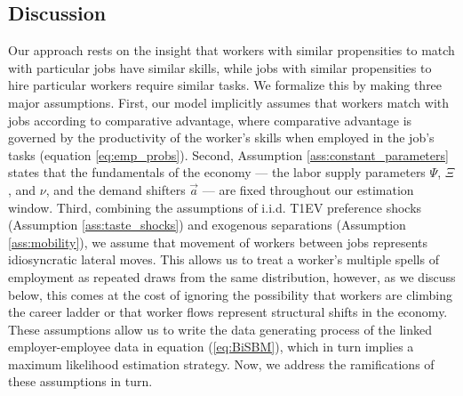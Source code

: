 \documentclass[12pt]{article}
\theoremstyle{definition}
\theoremstyle{plain}
\begin{document}
\subsection{Discussion}

\label{sec:bisbm_discussion}

Our approach rests on the insight that workers with similar propensities to match with particular jobs have similar skills, while jobs with similar propensities to hire particular workers require similar tasks. We formalize this by making three major assumptions. First, our model implicitly assumes that workers match with jobs according to comparative advantage, where comparative advantage is governed by the productivity of the worker's skills when employed in the job's tasks (equation \ref{eq:emp_probs}). Second, Assumption \ref{ass:constant_parameters} states that the fundamentals of the economy --- the labor supply parameters $\Psi$, $\Xi$, and $\nu$, and the demand shifters $\vec{a}$ --- are fixed throughout our estimation window.  Third, combining the assumptions of i.i.d. T1EV preference shocks (Assumption \ref{ass:taste_shocks}) and exogenous separations (Assumption \ref{ass:mobility}), we assume that movement of workers between jobs represents idiosyncratic lateral moves. This allows us to treat a worker's multiple spells of employment as repeated draws from the same distribution, however, as we discuss below, this comes at the cost of ignoring the possibility that workers are climbing the career ladder or that worker flows represent structural shifts in the economy. These assumptions allow us to write the data generating process of the linked employer-employee data in equation (\ref{eq:BiSBM}), which in turn implies a maximum likelihood estimation strategy. Now, we address the ramifications of these assumptions in turn. 
\end{document}
